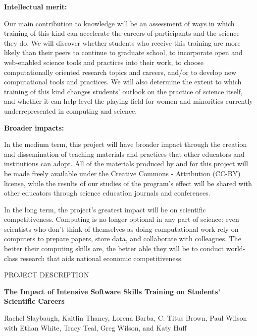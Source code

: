 \documentclass{proposalnsf}
\begin{document}
\textbf{Intellectual merit:}

Our main contribution to knowledge will be an assessment of ways in
which training of this kind can accelerate the careers of participants
and the science they do.  We will discover whether students who
receive this training are more likely than their peers to continue to
graduate school, to incorporate open and web-enabled science tools and
practices into their work, to choose computationally oriented research
topics and careers, and/or to develop new computational tools and
practices.  We will also determine the extent to which training of
this kind changes students' outlook on the practice of science itself,
and whether it can help level the playing field for women and
minorities currently underrepresented in computing and science.

\textbf {Broader impacts:}

In the medium term, this project will have broader impact through the
creation and dissemination of teaching materials and practices that
other educators and institutions can adopt.  All of the materials
produced by and for this project will be made freely available under
the Creative Commons - Attribution (CC-BY) license, while the results
of our studies of the program's effect will be shared with other
educators through science education journals and conferences.

In the long term, the project's greatest impact will be on scientific
competitiveness.  Computing is no longer optional in any part of
science: even scientists who don't think of themselves as doing
computational work rely on computers to prepare papers, store data,
and collaborate with colleagues.  The better their computing skills
are, the better able they will be to conduct world-class research that
aids national economic competitiveness.

\renewcommand{\thepage} {\footnotesize Project Summary}


\newpage

\pagestyle{plain}
\renewcommand{\thepage} {\arabic{page}}

\begin{center}
\small{PROJECT DESCRIPTION}


\large\textbf{The Impact of Intensive Software Skills Training on Students' Scientific Careers}

{\large \sf Rachel Slaybaugh, Kaitlin Thaney, Lorena Barba, C. Titus Brown, Paul Wilson\\ 
  with Ethan White, Tracy Teal, Greg Wilson, and Katy Huff}

\end{center}
\end{document}
